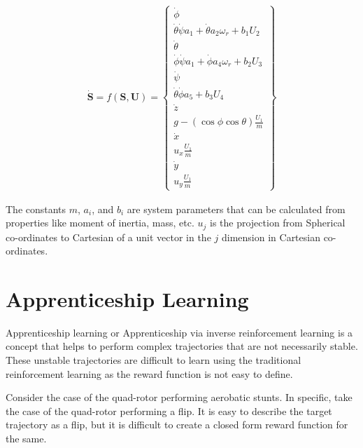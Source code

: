 \documentclass[hidelinks,BTech]{iitmdiss}
\begin{document}
\begin{equation} \begin{split}
  \dot{\mathbf{S}} = f(\mathbf{S}, \mathbf{U}) = \left\{
    \begin{array}{c}
      \dot{\phi} \\
      \dot{\theta} \dot{\psi} a_{1} + \dot{\theta} a_{2} \omega_{r} + b_{1} U_{2} \\
      \dot{\theta} \\
      \dot{\phi} \dot{\psi} a_{1} + \dot{\phi} a_{4} \omega_{r} + b_{2} U_{3} \\
      \dot{\psi} \\
      \dot{\theta} \dot{\phi} a_{5} + b_{3} U_{4} \\
      \dot{z} \\
      g  - (\cos{\phi} \cos{\theta})\frac{U_{1}}{m} \\
      \dot{x} \\
      u_{x} \frac{U_{1}}{m} \\
      \dot{y} \\
      u_{y} \frac{U_{1}}{m}
    \end{array}
  \right\}
\end{split} \end{equation}

The constants $m$, $a_{i}$, and $b_{i}$ are system parameters that can be calculated from properties like moment of inertia, mass, etc. $u_{j}$ is the projection from Spherical co-ordinates to Cartesian of a unit vector in the $j$ dimension in Cartesian co-ordinates.

\chapter{Apprenticeship Learning}

Apprenticeship learning or Apprenticeship via inverse reinforcement learning \cite{ApprenticeshipLearning} is a concept that helps to perform complex trajectories that are not necessarily stable. These unstable trajectories are difficult to learn using the traditional reinforcement learning as the reward function is not easy to define.

Consider the case of the quad-rotor performing aerobatic stunts. In specific, take the case of the quad-rotor performing a flip. It is easy to describe the target trajectory as a flip, but it is difficult to create a closed form reward function for the same.
\end{document}
